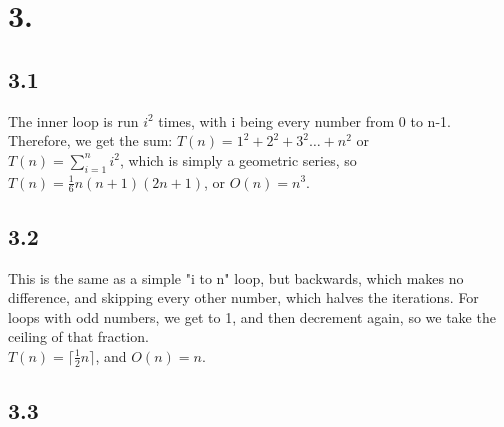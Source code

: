 \documentclass[12pt]{article}
\begin{document}
\section*{3.}
\subsection*{3.1}
The inner loop is run \(i^2\) times, with i being every number from 0 to n-1. Therefore, we get the sum:
\(T(n)=1^2+2^2+3^2\dots+n^2\) or\\
\(T(n)=\displaystyle\sum_{i=1}^n i^2\), which is simply a geometric series, so \(T(n)=\frac{1}{6}n(n+1)(2n+1)\), or \(O(n)=n^3\).
\subsection*{3.2}
This is the same as a simple "i to n" loop, but backwards, which makes no difference, and skipping every other number, which halves the iterations. For loops with odd numbers, we get to 1, and then decrement again, so we take the ceiling of that fraction.\\
\(T(n)=\lceil\frac{1}{2}n\rceil\), and \(O(n)=n\).\\
\subsection*{3.3}
\end{document}
